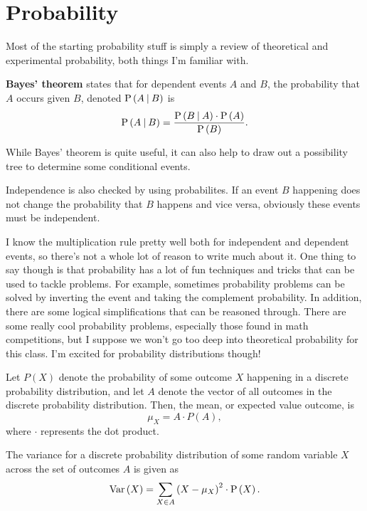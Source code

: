 \section{Probability}

Most of the starting probability stuff is simply a review of theoretical and
experimental probability, both things I'm familiar with.

\begin{blackbox}
    \begin{theorem}
        \textbf{Bayes' theorem} states that for dependent events \( A \) and \( B \), the
        probability that \( A \) occurs given \( B \), denoted \( \operatorname{P} \left( A \: \vert \: B \right) \) is
        \[
            \operatorname{P} \left( A \: \vert \: B \right) = \frac{\operatorname{P} \left( B \: \vert \: A \right) \cdot \operatorname{P} \left( A \right)}{\operatorname{P} \left( B \right)}
        .\]
    \end{theorem}
\end{blackbox}

While Bayes' theorem is quite useful, it can also help to draw out a
possibility tree to determine some conditional events.

Independence is also checked by using probabilites. If an event \( B \)
happening does not change the probability that \( B \) happens and vice versa,
obviously these events must be independent.

I know the multiplication rule pretty well both for independent and dependent
events, so there's not a whole lot of reason to write much about it. One thing
to say though is that probability has a lot of fun techniques and tricks that
can be used to tackle problems. For example, sometimes probability problems can
be solved by inverting the event and taking the complement probability. In
addition, there are some logical simplifications that can be reasoned through.
There are some really cool probability problems, especially those found in math
competitions, but I suppose we won't go too deep into theoretical probability
for this class. I'm excited for probability distributions though!

Let \( P \left( X \right) \) denote the probability of some outcome \( X \)
happening in a discrete probability distribution, and let \( A \) denote the
vector of all outcomes in the discrete probability distribution. Then, the mean, or expected value outcome, is
\[
    \mu_X = A \cdot P \left( A \right),
\]
where \( \cdot \) represents the dot product.

The variance for a discrete probability distribution of some random variable \(
X \) across the set of outcomes \( A \) is given as
\[
    \operatorname{Var} \left( X \right) = \sum_{X \in A} \left( X - \mu_X \right)^2 \cdot \operatorname{P} \left( X \right)
.\]

